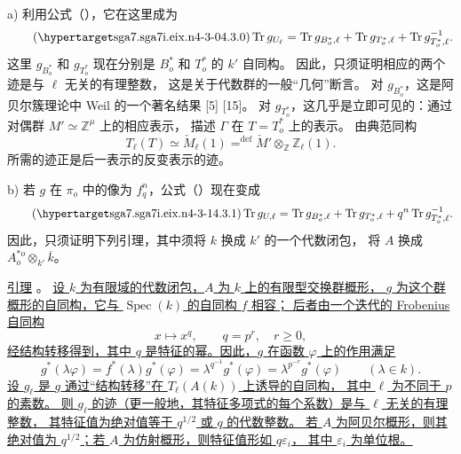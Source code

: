 \smallskip
\noindent
a) 利用公式（），它在这里成为
\begin{equation}\tag{\SGARefTarget{sga7.sga7i.eix.n4-3-0}{4.3.0}}
 \operatorname{Tr}g_{U_\ell}
 =\operatorname{Tr}g_{B^*_o,\ell}
 +\operatorname{Tr}g_{T^*_o,\ell}
 +\operatorname{Tr}g^{-1}_{T^*_o,\ell}.
\end{equation}
这里 $g_{B^*_o}$ 和 $g_{T^*_o}$ 现在分别是 $B^*_o$ 和 $T^*_o$ 的 $k'$ 自同构。
因此，只须证明相应的两个迹是与 $\ell$ 无关的有理整数，
这是关于代数群的一般“几何”断言。
对 $g_{B^*_o}$，这是阿贝尔簇理论中 Weil 的一个著名结果 [5] [15]。
对 $g_{T^*_o}$，这几乎是立即可见的：通过对偶群 $M'\simeq\mathbb Z^\mu$ 上的相应表示，
描述 $\Gamma$ 在 $T=T^*_o$ 上的表示。
由典范同构
\[
 T_\ell(T)\simeq\check M_\ell(1)
 \mathrel{\mathop{=}^{\mathrm{def}}}
 \check M'\otimes_{\mathbb Z}\mathbb Z_\ell(1).
\]
所需的迹正是后一表示的反变表示的迹。

\smallskip
\noindent
b) 若 $g$ 在 $\pi_o$ 中的像为 $f_q^{n}$，公式（）现在变成
\begin{equation}\tag{\SGARefTarget{sga7.sga7i.eix.n4-3-1}{4.3.1}}
 \operatorname{Tr}g_{U,\ell}
 =\operatorname{Tr}g_{B^*_o,\ell}
 +\operatorname{Tr}g_{T^*_o,\ell}
 +q^n\operatorname{Tr}g^{-1}_{T^*_o,\ell}.
\end{equation}
因此，只须证明下列引理，其中须将 $k$ 换成 $k'$ 的一个代数闭包，
将 $A$ 换成 $A^{*o}_o\otimes_{k'}\overline k$。

\medskip
\noindent
\underline{引理} 。
\underline{设 $k$ 为有限域的代数闭包，$A$ 为 $k$ 上的有限型交换群概形，
$g$ 为这个群概形的自同构，它与 $\operatorname{Spec}(k)$ 的自同构 $f$ 相容；
后者由一个迭代的 Frobenius 自同构}
\[
 x\longmapsto x^q,
 \qquad q=p^r,\quad r\geq0,
\]
\underline{经结构转移得到，其中 $q$ 是特征的幂。因此，$g$ 在函数 $\varphi$ 上的作用满足}
\[
 g^*(\lambda\varphi)=f^*(\lambda)g^*(\varphi)
 =\lambda^{q^{-1}}g^*(\varphi)
 =\lambda^{p^{-r}}g^*(\varphi)
 \qquad(\lambda\in k).
\]
\underline{设 $g_\ell$ 是 $g$ 通过“结构转移”在 $T_\ell(A(k))$ 上诱导的自同构，
其中 $\ell$ 为不同于 $p$ 的素数。
则 $g_\ell$ 的迹（更一般地，其特征多项式的每个系数）是与 $\ell$ 无关的有理整数，
其特征值为绝对值等于 $q^{1/2}$ 或 $q$ 的代数整数。
若 $A$ 为阿贝尔概形，则其绝对值为 $q^{1/2}$；若 $A$ 为仿射概形，则特征值形如 $q\varepsilon_i$，
其中 $\varepsilon_i$ 为单位根。}

